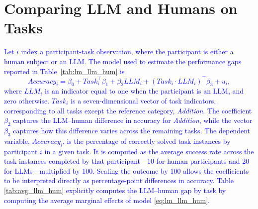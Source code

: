 \documentclass[12pt,a4paper]{article}
\newcommand{\blue}[1]{\textcolor{blue}{#1}}
\begin{document}

\section{Comparing LLM and Humans on Tasks}\label{app:lmLLMvsHum}

\blue{Let $i$ index a participant-task observation, where the participant is either a human subject or an LLM. The model used to estimate the performance gaps reported in Table~\ref{tab:lm_llm_hum} is
%
\begin{equation}\label{eq:lm_llm_hum}
\mathit{Accuracy}_i = \beta_0 + \mathit{Task}_i^\top\beta_1 + \beta_2 \mathit{LLM}_i 
+ (\mathit{Task}_i \cdot \mathit{LLM}_i)^\top\beta_3 + u_i,
\end{equation}
%
where $\mathit{LLM}_i$ is an indicator equal to one when the participant is an LLM, and zero otherwise. $\mathit{Task}_i$ is a seven-dimensional vector of task indicators, corresponding to all tasks except the reference category, \emph{Addition}. The coefficient $\beta_2$ captures the LLM--human difference in accuracy for \emph{Addition}, while the vector $\beta_3$ captures how this difference varies across the remaining tasks. 
%
The dependent variable, $\mathit{Accuracy}_i$, is the percentage of correctly solved task instances by participant $i$ in a given task. It is computed as the average success rate across the task instances completed by that participant---10 for human participants and 20 for LLMs---multiplied by 100. Scaling the outcome by 100 allows the coefficients to be interpreted directly as percentage-point differences in accuracy.
Table \ref{tab:avg_llm_hum} explicitly computes the LLM--human gap by task by computing the average marginal effects of model \eqref{eq:lm_llm_hum}.}
\end{document}
